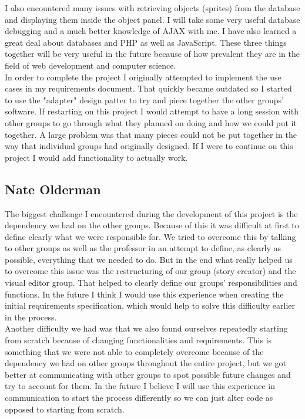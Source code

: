 \documentclass[12pt]{article}
\begin{document}
I also encountered many issues with retrieving objects (sprites) from the database and displaying them inside the object panel. I will take some very useful database debugging and a much better knowledge of AJAX with me. I have also learned a great deal about databases and PHP as well as JavaScript. These three things together will be very useful in the future because of how prevalent they are in the field of web development and computer science. \\

In order to complete the project I originally attempted to implement the use cases in my requirements document. That quickly became outdated so I started to use the "adapter" design patter to try and piece together the other groups' software. If restarting on this project I would attempt to have a long session with other groups to go through what they planned on doing and how we could put it together.  A large problem was that many pieces could not be put together in the way that individual groups had originally designed. If I were to continue on this project I would add functionality to actually work.

\subsection{Nate Olderman}
The biggest challenge I encountered during the development of this project is the dependency we had on the other groups. Because of this it was difficult at first to define clearly what we were responsible for. We tried to overcome this by talking to other groups as well as the professor in an attempt to define, as clearly as possible, everything that we needed to do. But in the end what really helped us to overcome this issue was the restructuring of our group (story creator) and the visual editor group. That helped to clearly define our groups' responsibilities and functions. In the future I think I would use this experience when creating the initial requirements specification, which would help to solve this difficulty earlier in the process. \\

Another difficulty we had was that we also found ourselves repeatedly starting from scratch because of changing functionalities and requirements. This is something that we were not able to completely overcome because of the dependency we had on other groups throughout the entire project, but we got better at communicating with other groups to spot possible future changes and try to account for them. In the future I believe I will use this experience in communication to start the process differently so we can just alter code as opposed to starting from scratch. \\
\end{document}
